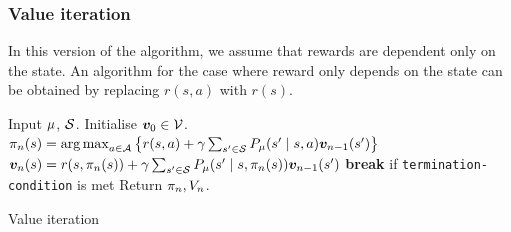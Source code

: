\subsubsection{Value iteration}
In this version of the algorithm, we assume that rewards are dependent only on the state. An algorithm for the case where reward only depends on the state can be obtained by replacing $r(s,a)$ with $r(s)$.
\label{sec:value-iteration}
\begin{frame}
  \begin{algorithm}[H]
    \begin{algorithmic}
      \State Input $\mu$, ${\mathcal{S}}$.
      \State Initialise $\val_0 \in \Vals$. %
      \State $\pol_n(s) = \argmax_{a \in \CA} \set{r(s, a) + \disc \sum_{s' \in \CS} P_\mdp(s' \mid s, a) \val_{n-1} (s')}$
      \State $\val_n(s) = r(s, \pol_n(s)) + \disc \sum_{s' \in \CS} P_\mdp(s' \mid s, \pol_n(s)) \val_{n-1} (s')$
      \EndFor
      \State \textbf{break} if \texttt{termination-condition} is met %
      \EndFor
      \State Return $\pi_n, V_n$.
    \end{algorithmic}
    \caption{Value iteration}
  \end{algorithm}
\end{frame}

